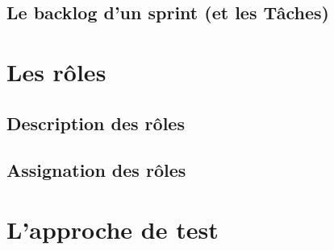 \subsection{Le backlog d’un sprint (et les Tâches)}

\section{Les rôles}

\subsection{Description des rôles}

\subsection{Assignation des rôles}

\section{L'approche de test}

 
